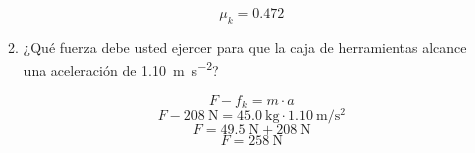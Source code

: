 \documentclass[Física - Práctica.root.tex]{subfiles}
\begin{document}
\begin{enumerate}
\begin{enumerate}
\begin{center}
                  \[ \boxed{ \mu_k = \num{0,472} } \]
                \end{center}
          \item ¿Qué fuerza debe usted ejercer para que la caja de herramientas alcance una aceleración de \SI[per-mode=symbol]{1,10}{\meter\per\second\squared}?
                \begin{center}
                  \[ F - f_k = m\cdot a \]
                  \[ F - \SI{208}{\newton} = \SI{45,0}{\kilo\gram}\cdot\SI{1,10}{\meter\per\second\squared} \]
                  \[ F = \SI{49,5}{\newton} + \SI{208}{\newton} \]
                  \[ F = \SI{258}{\newton} \]
                \end{center}
        \end{enumerate}
\end{enumerate}
\end{document}

